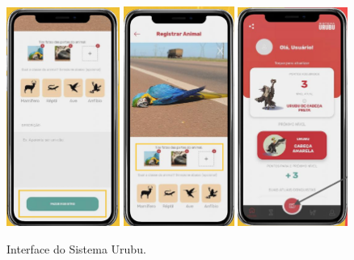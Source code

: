 \begin{figure}[htb]
  \centering
  \includegraphics[width=0.33\textwidth]{imagens/app1.png}
  \includegraphics[width=0.323\textwidth]{imagens/app3.png}
  \includegraphics[width=0.32\textwidth]{imagens/app2.png}
  \caption{Interface do Sistema Urubu.}
  \label{fig:urubuApp}
\end{figure}


